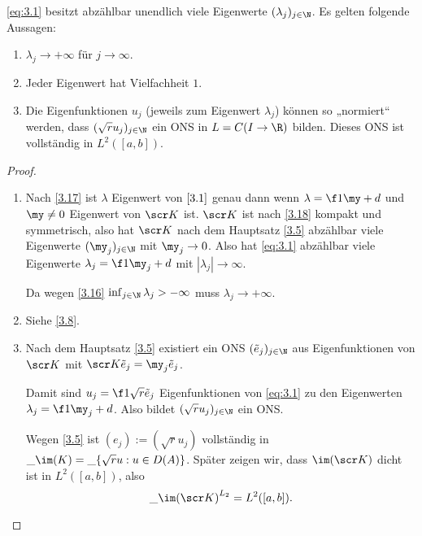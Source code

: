 \begin{st} \label{3.19}
	\eqref{eq:3.1} besitzt abzählbar unendlich viele Eigenwerte $(\lambda_j)_{j\in \N}$.
	Es gelten folgende Aussagen:
	\begin{enumerate}[1)]
		\item
			$\lambda_j \to + \infty$ für $j \to \infty$.
		\item
			Jeder Eigenwert hat Vielfachheit $1$.
		\item
			Die Eigenfunktionen $u_j$ (jeweils zum Eigenwert $\lambda_j$) können so „normiert“ werden, dass $(\sqrt {r} u_j)_{j\in\N}$ ein ONS in $L = C(I \to \R)$ bilden.
			Dieses ONS ist vollständig in $L^2([a,b])$.
	\end{enumerate}
	\begin{proof}
		\begin{enumerate}[1)]
			\item
				Nach \ref{3.17} ist $\lambda$ Eigenwert von $\eqref{3.1}$ genau dann wenn $\lambda = \f 1\my + d$ und $\my \neq 0$ Eigenwert von $\scr K$ ist.
				$\scr K$ ist nach \ref{3.18} kompakt und symmetrisch, also hat $\scr K$ nach dem Hauptsatz \ref{3.5} abzählbar viele Eigenwerte $(\my_j)_{j\in\N}$ mit $\my_j \to 0$.
				Also hat \eqref{eq:3.1} abzählbar viele Eigenwerte $\lambda_j = \f 1{\my_j} + d$ mit $|\lambda_j| \to \infty$.

				Da wegen \ref{3.16}  $\inf_{j\in \N} \lambda_j > -\infty$ muss $\lambda_j \to +\infty$.
			\item
				Siehe \ref{3.8}.
			\item
				Nach dem Hauptsatz \ref{3.5} existiert ein ONS $(\tilde e_j)_{j\in\N}$ aus Eigenfunktionen von $\scr K$ mit $\scr K \tilde e_j = \my_j \tilde e_j$.

				Damit sind $u_j = \f 1{\sqrt r} \tilde e_j$ Eigenfunktionen von \eqref{eq:3.1} zu den Eigenwerten $\lambda_j = \f 1{\my_j} + d$.
				Also bildet $(\sqrt{r} u_j)_{j\in \N}$ ein ONS.

				Wegen \ref{3.5} ist $(e_j) := (\sqrt{r} u_j)$ vollständig in $\_{\im (K)} = \_{\{\sqrt{r} u : u  \in D(A) \}}$.
				Später zeigen wir, dass $\im (\scr K)$ dicht ist in $L^2([a,b])$, also
				\[
					\_{\im(\scr K)}^{L_2} = L^2 ([a,b]).
				\]
		\end{enumerate}
	\end{proof}
\end{st}

